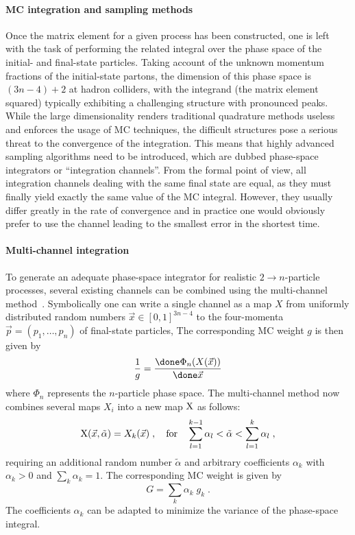 \paragraph{MC integration and sampling methods}
Once the matrix element for a given process has been constructed, one is left with 
the task of performing the related integral over the phase space of the 
initial- and final-state particles. Taking account of the unknown
momentum fractions of the initial-state partons, the dimension of this phase space 
is $(3n-4)+2$ at hadron colliders, with the integrand (the matrix element 
squared) typically exhibiting a challenging structure with pronounced peaks.  
While the large dimensionality renders traditional quadrature methods useless 
and enforces the usage of MC techniques, the difficult structures 
pose a serious threat to the convergence of the integration.  
This means that highly advanced sampling algorithms need to be introduced,
which are dubbed phase-space integrators or ``integration channels''.
From the formal point of view, all integration channels dealing with the same 
final state are equal, as they must finally yield exactly the same value 
of the MC integral. However, they usually differ greatly in the
rate of convergence and in practice one would obviously prefer to use 
the channel leading to the smallest error in the shortest time.

\paragraph{Multi-channel integration}
To generate an adequate phase-space integrator for realistic 
$2\to n$-particle processes, several existing channels can be combined 
using the multi-channel method~\cite{Kleiss:1994qy}. 
Symbolically one can write a single channel as a map $X$ from uniformly 
distributed random numbers $\vec x\in[0,1]^{3n-4}$
to the four-momenta $\vec p=(p_1,\ldots,p_n)$ of final-state particles,
The corresponding MC weight $g$ is then given by
\begin{equation}
  \frac{1}{g}=\frac{\done\Phi_n(X(\vec x))}{\done\vec x}
\end{equation}
where $\Phi_n$ represents the $n$-particle phase space.
The multi-channel method now combines several maps $X_i$ into a new map
$\rm X$ as follows:
\begin{equation}\label{eq:gen_point_mc}
  {\rm X}(\vec x,\tilde\alpha)=X_k(\vec x)\;,\quad\text{for}\quad
  \sum_{l=1}^{k-1}\alpha_l<\tilde\alpha<\sum_{l=1}^{k}\alpha_l\;,
\end{equation}
requiring an additional random number $\tilde\alpha$ and arbitrary
coefficients $\alpha_k$ with $\alpha_k>0$ and $\sum_k \alpha_k=1$. 
The corresponding MC weight is given by
\begin{equation}\label{eq:gen_weight_mc}
  G=\sum_k \alpha_k\; g_k\;.
\end{equation}
The coefficients $\alpha_k$ can be adapted to minimize the variance of the 
phase-space integral.

